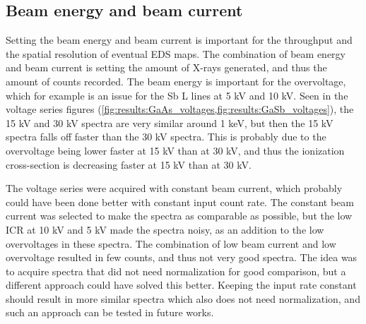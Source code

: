 \subsection{Beam energy and beam current}
\label{discussion:beam_energy_current}

Setting the beam energy and beam current is important for the throughput and the spatial resolution of eventual EDS maps.
The combination of beam energy and beam current is setting the amount of X-rays generated, and thus the amount of counts recorded.
The beam energy is important for the overvoltage, which for example is an issue for the Sb L lines at 5 kV and 10 kV.
Seen in the voltage series figures (\cref{fig:results:GaAs_voltages,fig:results:GaSb_voltages}), the 15 kV and 30 kV spectra are very similar around 1 keV, but then the 15 kV spectra falls off faster than the 30 kV spectra.
This is probably due to the overvoltage being lower faster at 15 kV than at 30 kV, and thus the ionization cross-section is decreasing faster at 15 kV than at 30 kV.

The voltage series were acquired with constant beam current, which probably could have been done better with constant input count rate.
The constant beam current was selected to make the spectra as comparable as possible, but the low ICR at 10 kV and 5 kV made the spectra noisy, as an addition to the low overvoltages in these spectra.
The combination of low beam current and low overvoltage resulted in few counts, and thus not very good spectra.
The idea was to acquire spectra that did not need normalization for good comparison, but a different approach could have solved this better.
Keeping the input rate constant should result in more similar spectra which also does not need normalization, and such an approach can be tested in future works.


